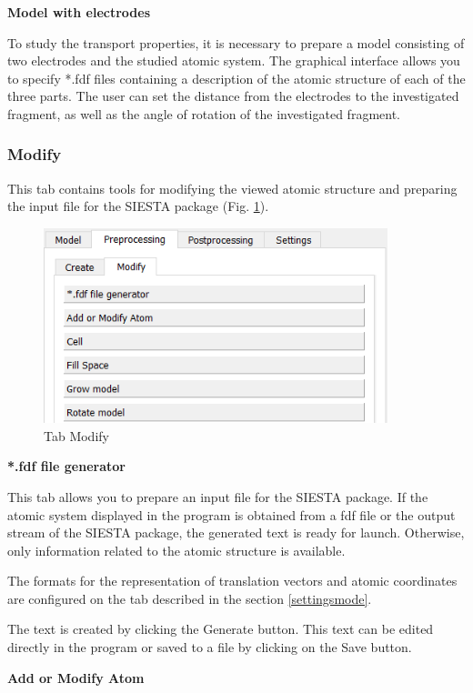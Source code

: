 \documentclass{article}
\begin{document}
\textbf{Model with electrodes}

To study the transport properties, it is necessary to prepare a model consisting of two electrodes and the studied atomic system. The graphical interface allows you to specify *.fdf files containing a description of the atomic structure of each of the three parts. The user can set the distance from the electrodes to the investigated fragment, as well as the angle of rotation of the investigated fragment.

\subsubsection{Modify}

This tab contains tools for modifying the viewed atomic structure and preparing the input file for the SIESTA package (Fig. \ref{fig:premodify}).

\begin{figure}[h!]
	\centering
	\includegraphics[width=10.0cm]{premodify}
	\caption{Tab Modify}
	\label{fig:premodify}
\end{figure}


\textbf{*.fdf file generator}

This tab allows you to prepare an input file for the SIESTA package. If the atomic system displayed in the program is obtained from a fdf file or the output stream of the SIESTA package, the generated text is ready for launch. Otherwise, only information related to the atomic structure is available.

The formats for the representation of translation vectors and atomic coordinates are configured on the tab described in the section \ref{settingsmode}.

The text is created by clicking the Generate button. This text can be edited directly in the program or saved to a file by clicking on the Save button.

\textbf{Add or Modify Atom}
\end{document}
